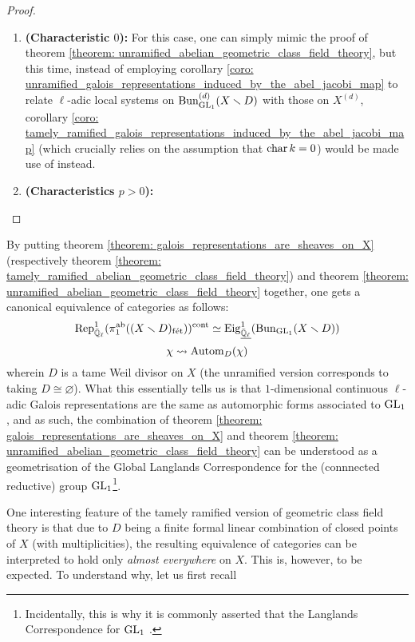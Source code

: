             \begin{proof}
                \noindent
                \begin{enumerate}
                    \item \textbf{(Characteristic $0$):} For this case, one can simply mimic the proof of theorem \ref{theorem: unramified_abelian_geometric_class_field_theory}, but this time, instead of employing corollary \ref{coro: unramified_galois_representations_induced_by_the_abel_jacobi_map} to relate $\ell$-adic local systems on $\mathrm{Bun}_{\operatorname{GL}_1}^{(d)}(X \smallsetminus D)$ with those on $X^{(d)}$, corollary \ref{coro: tamely_ramified_galois_representations_induced_by_the_abel_jacobi_map} (which crucially relies on the assumption that $\operatorname{char} k = 0$) would be made use of instead.
                    \item \textbf{(Characteristics $p > 0$):}
                \end{enumerate}
            \end{proof}
        
        \begin{corollary} \label{coro: geometric_langlands_for_GL1}
            By putting theorem \ref{theorem: galois_representations_are_sheaves_on_X} (respectively theorem \ref{theorem: tamely_ramified_abelian_geometric_class_field_theory}) and theorem \ref{theorem: unramified_abelian_geometric_class_field_theory} together, one gets a canonical equivalence of categories as follows:
                $$\mathrm{Rep}_{\bar{\mathbb{Q}}_{\ell}}^1(\pi_1^{\mathrm{ab}}((X \smallsetminus D)_{\mathrm{f\acute{e}t}}))^{\mathrm{cont}} \simeq \mathrm{Eig}_{\underline{\bar{\mathbb{Q}}_{\ell}}}^1(\mathrm{Bun}_{\operatorname{GL}_1}(X \smallsetminus D))$$
                $$\chi \leadsto \mathrm{Autom}_D(\chi)$$
            wherein $D$ is a tame Weil divisor on $X$ (the unramified version corresponds to taking $D \cong \varnothing$). What this essentially tells us is that $1$-dimensional continuous $\ell$-adic Galois representations are the same as automorphic forms associated to $\operatorname{GL}_1$, and as such, the combination of theorem \ref{theorem: galois_representations_are_sheaves_on_X} and theorem \ref{theorem: unramified_abelian_geometric_class_field_theory} can be understood as a geometrisation of the Global Langlands Correspondence for the (connnected reductive) group $\operatorname{GL}_1$\footnote{Incidentally, this is why it is commonly asserted that the Langlands Correspondence for $\operatorname{GL}_1$ .}. 
        \end{corollary}
        \begin{remark} \label{remark: geometric_vs_classical_class_field_theory}
            One interesting feature of the tamely ramified version of geometric class field theory is that due to $D$ being a finite formal linear combination of closed points of $X$ (with multiplicities), the resulting equivalence of categories can be interpreted to hold only \textit{almost everywhere} on $X$. This is, however, to be expected. To understand why, let us first recall 
        \end{remark}
        
